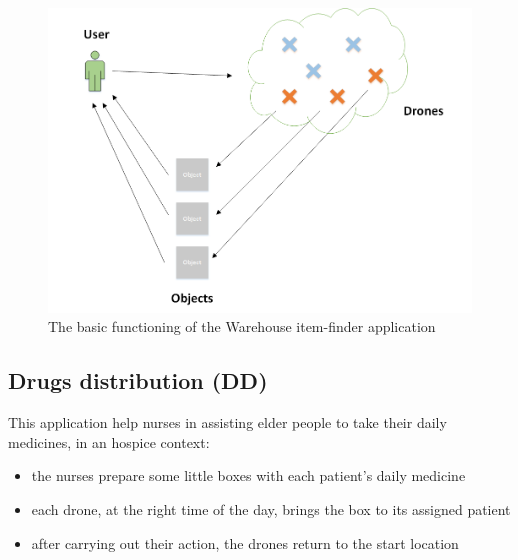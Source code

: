\begin{figure}[H]
  \centering
  \includegraphics[width=\linewidth]{pictures/WIF.png}
  \caption{The basic functioning of the Warehouse item-finder application}
  \label{fig:WIS}
\end{figure}


\newpage

\subsection{Drugs distribution (DD)}\label{dd}

This application help nurses in assisting elder people to take their daily medicines, in an hospice context:

\begin{itemize}
\itemsep2pt
\item{
the nurses prepare some little boxes with each patient’s daily medicine
}
\item{
each drone, at the right time of the day, brings the box to its assigned patient
}
\item{
after carrying out their action, the drones return to the start location
}

\end{itemize}


